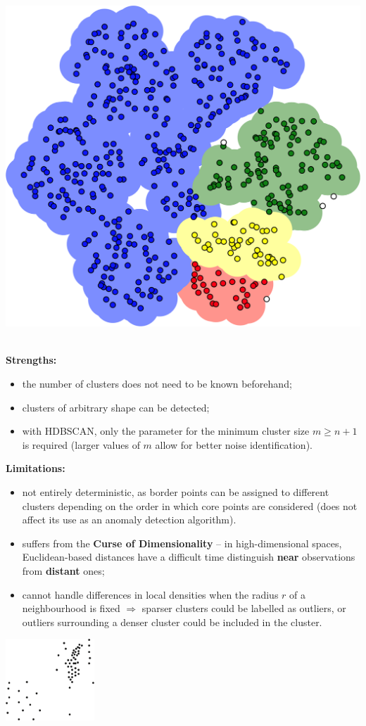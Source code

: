 \documentclass[20pt,landscape,footrule,headrule]{foils}
\begin{document}
{{\newpage
\begin{center}
\includegraphics[height=\textheight]{Images/clustering2}
\end{center}

\newpage\ \\ \noindent \textbf{Strengths:} 
\begin{itemize}
\item the number of clusters does not need to be known beforehand; \item clusters of arbitrary shape can be detected; 
\item with HDBSCAN, only the parameter for the minimum cluster size $m\geq n+1$ is required  (larger values of $m$ allow for better noise identification).
\end{itemize} \textbf{Limitations:}
\begin{itemize}
\item not entirely deterministic, as border points can be assigned to different clusters depending on the order in which core points are considered (does not affect its use as an anomaly detection algorithm).
\newpage\ \item suffers from the \textbf{Curse of Dimensionality} -- in high-dimensional spaces,  Euclidean-based distances have a difficult time distinguish \textbf{near} observations from \textbf{distant} ones; \item  cannot handle differences in local densities when the radius $r$  of a neighbourhood  is fixed $\Longrightarrow$ sparser clusters could be  labelled as outliers, or outliers surrounding a denser cluster could be included in the cluster.
\end{itemize}
\begin{center}
\includegraphics[width=0.25\textwidth]{Images/clustering4}
\end{center}

}}
\end{document}
